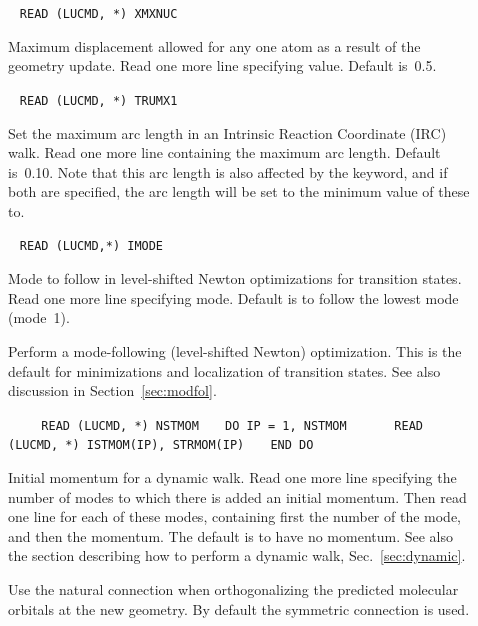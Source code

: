 \begin{description}
\item[]\verb| |\newline
\verb|READ (LUCMD, *) XMXNUC|

Maximum displacement allowed for any one
atom as a result of the geometry update.  Read one more line
specifying value.  Default is~0.5.

\item[]\verb| |\newline
\verb|READ (LUCMD, *) TRUMX1|

Set the maximum arc length in an Intrinsic Reaction Coordinate (IRC)
walk. Read one more
line containing the maximum arc length.
Default is~0.10. Note that this arc length is also affected by the
 keyword, and if both are specified, the arc length will
be set to the minimum value of these to.

\item[]\verb| |\newline
\verb|READ (LUCMD,*) IMODE|

Mode to follow in level-shifted Newton optimizations for transition
states.  Read one more line specifying
mode. Default is to follow
the lowest mode (mode~1).

\item[] Perform a mode-following (level-shifted
Newton) optimization. This is the default for minimizations and
localization of transition states. See also discussion in
Section~\ref{sec:modfol}.

\item[]\verb| |\newline
\verb|   READ (LUCMD, *) NSTMOM|\newline
\verb|   DO IP = 1, NSTMOM|\newline
\verb|      READ (LUCMD, *) ISTMOM(IP), STRMOM(IP)|\newline
\verb|   END DO|

Initial momentum for a dynamic walk.
Read one more line specifying
the number of modes to which there is added an initial momentum. Then
read one line for each of these modes, containing first the number of
the mode, and then the momentum. The default is to have no momentum.
See also the section describing how to perform a dynamic
walk, Sec.~\ref{sec:dynamic}.

\item[] Use the natural connection when orthogonalizing
the predicted molecular orbitals at the new geometry. By default the
symmetric connection is used.


\end{description}
